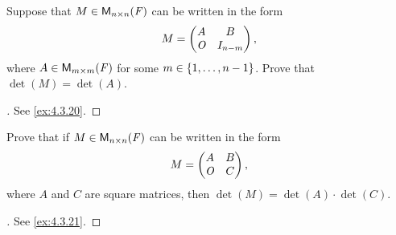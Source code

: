 \exercisesection

\setcounter{ex}{4}
\begin{ex}\label{ex:4.4.5}
  Suppose that \(M \in \mathsf{M}_{{n} \times n}({\mathit{F}})\) can be written in the form
  \[
    M = \begin{pmatrix}
      A   & B         \\
      \mathit{O} & I_{n - m}
    \end{pmatrix},
  \]
  where \(A \in \mathsf{M}_{{m} \times m}({\mathit{F}})\) for some \(m \in \left\lbrace1, \dots, n - 1\right\rbrace\).
  Prove that \(\det(M) = \det(A)\).
\end{ex}

\begin{proof}[]
  See \cref{ex:4.3.20}.
\end{proof}

\begin{ex}\label{ex:4.4.6}
  Prove that if \(M \in \mathsf{M}_{{n} \times n}({\mathit{F}})\) can be written in the form
  \[
    M = \begin{pmatrix}
      A   & B \\
      \mathit{O} & C
    \end{pmatrix},
  \]
  where \(A\) and \(C\) are square matrices, then \(\det(M) = \det(A) \cdot \det(C)\).
\end{ex}

\begin{proof}[]
  See \cref{ex:4.3.21}.
\end{proof}
